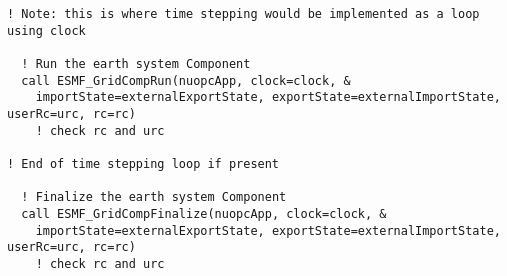 \begin{verbatim}
! Note: this is where time stepping would be implemented as a loop using clock

  ! Run the earth system Component
  call ESMF_GridCompRun(nuopcApp, clock=clock, &
    importState=externalExportState, exportState=externalImportState, userRc=urc, rc=rc)
    ! check rc and urc

! End of time stepping loop if present

  ! Finalize the earth system Component
  call ESMF_GridCompFinalize(nuopcApp, clock=clock, &
    importState=externalExportState, exportState=externalImportState, userRc=urc, rc=rc)
    ! check rc and urc
\end{verbatim}




